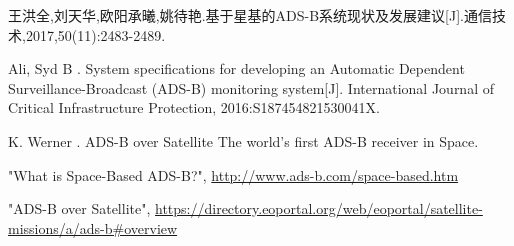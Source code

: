 
\begin{thebibliography}{99}

王洪全,刘天华,欧阳承曦,姚待艳.基于星基的ADS-B系统现状及发展建议[J].通信技术,2017,50(11):2483-2489.




 Ali, Syd B . System specifications for developing an Automatic Dependent Surveillance-Broadcast (ADS-B) monitoring system[J]. International Journal of Critical Infrastructure Protection, 2016:S187454821530041X.

 K. Werner . ADS-B over Satellite The world’s first ADS-B receiver in Space.



"What is Space-Based ADS-B?", \url{http://www.ads-b.com/space-based.htm}

"ADS-B over Satellite", \url{https://directory.eoportal.org/web/eoportal/satellite-missions/a/ads-b#overview}



\end{thebibliography}